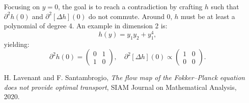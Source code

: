 \documentclass{article}
\begin{document}
Focusing on $y = 0$, the goal is to reach a contradiction by crafting $h$ such that  $\partial^2 h(0)$  and   $\partial^2[\Delta h](0)$ do not commute. 
Around $0$, $h$ must be at least a polynomial of degree 4. An example in dimension 2 is:
\[
    h(y) = y_1 y_2 + y_1^4,
\]
yielding:
\[
    \partial^2 h(0) = \begin{pmatrix} 0 & 1 \\ 1 & 0 \end{pmatrix}, \quad 
    \partial^2[\Delta h](0) \propto \begin{pmatrix} 1 & 0 \\ 0 & 0 \end{pmatrix}.
\]

\begin{thebibliography}{9}
    H. Lavenant and F. Santambrogio, \emph{The flow map of the Fokker--Planck equation does not provide optimal transport}, SIAM Journal on Mathematical Analysis, 2020.
\end{thebibliography}
\end{document}

